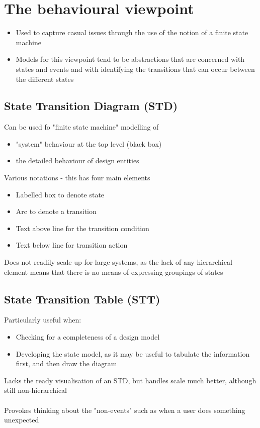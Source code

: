 \documentclass{article}[18pt]
\begin{document}
\section{The behavioural viewpoint}
\begin{itemize}
	\item Used to capture casual issues through the use of the notion of a finite state machine
	\item Models for this viewpoint tend to be abstractions that are concerned with states and events and with identifying the transitions that can occur between the different states
\end{itemize}
\subsection{State Transition Diagram (STD)}
Can be used fo "finite state machine" modelling of
\begin{itemize}
	\item "system" behaviour at the top level (black box)
	\item the detailed behaviour of design entities
\end{itemize}
Various notations - this has four main elements
\begin{itemize}
	\item Labelled box to denote state
	\item Arc to denote a transition
	\item Text above line for the transition condition
	\item Text below line for transition action
\end{itemize}
Does not readily scale up for large systems, as the lack of any hierarchical element means that there is no means of expressing groupings of states
\subsection{State Transition Table (STT)}
Particularly useful when:
\begin{itemize}
	\item Checking for a completeness of a design model
	\item Developing the state model, as it may be useful to tabulate the information first, and then draw the diagram
\end{itemize} 
Lacks the ready visualisation of an STD, but handles scale much better, although still non-hierarchical\\
\\
Provokes thinking about the "non-events" such as when a user does something unexpected
\end{document}
